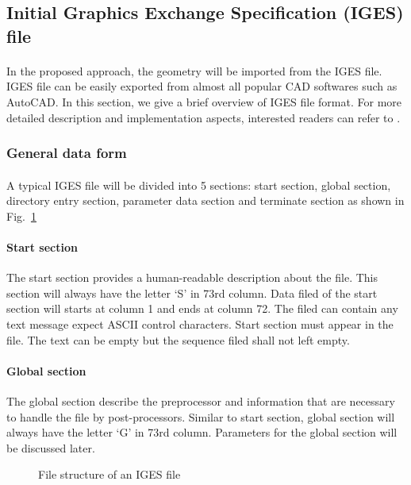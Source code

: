 \subsection{Initial Graphics Exchange Specification (IGES) file}
\paragraph{}
In the proposed approach, the geometry will be imported from the IGES file.
IGES file can be easily exported from almost all popular CAD softwares such as AutoCAD.
In this section, we give a brief overview of IGES file format.
For more detailed description and implementation aspects, interested readers can refer to \cite{uspro2006}.

\subsubsection{General data form}
\paragraph{}
A typical IGES file will be divided into 5 sections: start section, global section, directory entry section, parameter data section and terminate section as shown in Fig.~\ref{lr_fig:iges_data_form}

\paragraph{Start section}
The start section provides a human-readable description about the file.
This section will always have the letter `S' in 73rd column.
Data filed of the start section will starts at column 1 and ends at column 72.
The filed can contain any text message expect ASCII control characters.
Start section must appear in the file.
The text can be empty but the sequence filed shall not left empty.

\paragraph{Global section}
The global section describe the preprocessor and information that are necessary to handle the file by post-processors.
Similar to start section, global section will always have the letter `G' in 73rd column.
Parameters for the global section will be discussed later.

\begin{figure}[!ht]
    \centering
    \caption{File structure of an IGES file}
    \label{lr_fig:iges_data_form}
\end{figure}